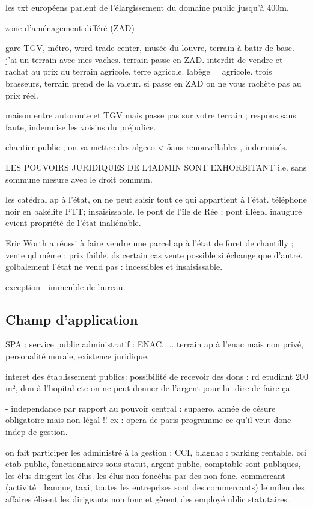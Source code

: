 \documentclass[a4paper,12pt]{article}
\begin{document}
les txt européens parlent de l'élargissement du domaine public jusqu'à 400m.


zone d'aménagement différé (ZAD)

gare TGV, métro, word trade center, musée du louvre, terrain à batir de base. 
j'ai un terrain avec mes vaches. terrain passe en ZAD. interdit de vendre et rachat au prix du terrain 
agricole. terre agricole.  labège = agricole. trois brasseurs, terrain prend  de la valeur.
si passe en ZAD on ne vous rachète pas au prix réel.


maison entre autoroute et TGV mais passe pas sur votre terrain ; respons sans faute, indemnise les voisins du préjudice.

chantier public ; on va mettre des algeco < 5ans renouvellables., indemnisés.
 
LES POUVOIRS JURIDIQUES DE L4ADMIN SONT EXHORBITANT i.e. sans sommune mesure avec le droit commun.

les catédral ap à l'état, on ne peut saisir tout ce qui appartient à l'état. téléphone noir en bakélite PTT; insaisissable. le pont de l'île de Rée ; pont illégal inauguré evient propriété de l'état inaliénable.


Eric Worth a réussi à faire vendre une parcel ap à l'état de foret de chantilly ; vente qd même ; prix faible.
ds certain cas vente possible si échange que d'autre.
golbalement l'état ne vend pas : incessibles et insaisissable.

exception : immeuble de bureau.

 


\subsection{Champ d'application}


SPA : service public administratif : ENAC, ... terrain ap à l'enac mais non privé, personalité morale, existence juridique.  

interet des établissement publics: possibilité de recevoir des dons : rd etudiant 200 m², don à l'hopital etc
on ne peut donner de l'argent pour lui dire de faire ça.

- independance par rapport au pouvoir central : supaero, année de césure obligatoire mais non légal !!
ex : opera de paris programme ce qu'il veut donc indep de gestion.

on fait participer les administré à la gestion  : CCI, blagnac : parking rentable, cci etab public, 
fonctionnaires sous statut, argent public, comptable sont publiques, les élus dirigent les élus.
les élus non foncélus par des non fonc. commercant (activité : banque, taxi, toutes les entreprises sont des commercants) le mileu des affaires élisent les dirigeants non fonc et gèrent des employé ublic statutaires.
\end{document}
